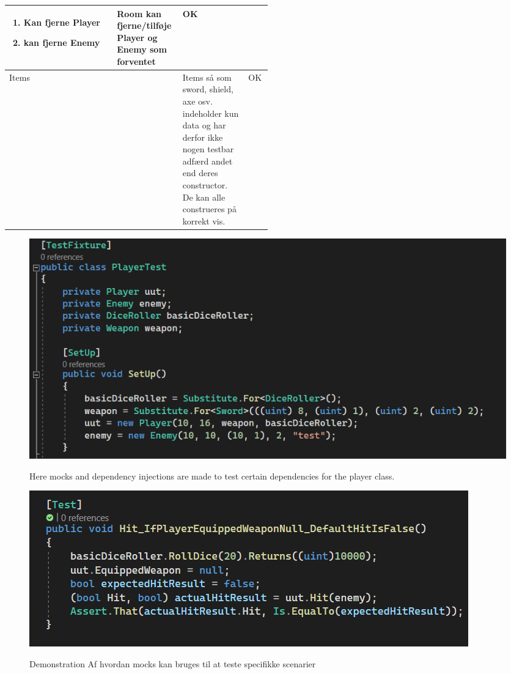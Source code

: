 \begin{center}
\begin{longtable}{|l|p{0.25\linewidth}|p{0.25\linewidth}|l|}
\begin{enumerate}
    \item Kan fjerne Player
    \item kan fjerne Enemy
  \end{enumerate}
  &
  \flushleft
  Room kan fjerne/tilføje Player og Enemy som forventet
  &
  OK
  \\ \hline
  Items
  &
  \begin{enumerate}
  \end{enumerate}
  &
  \flushleft
  Items så som sword, shield, axe osv. indeholder kun data og har derfor ikke nogen
  testbar adfærd andet end deres constructor. De kan alle construeres på korrekt vis.
  &
  OK
  \\ \hline
\end{longtable}
\addtocounter{table}{-1}
\end{center}

\newpage 

\begin{figure}[h]
  \centering
  \caption{Here mocks and dependency injections are made to test 
  certain dependencies for the player class.}
  \includegraphics[scale=0.5]{02-Body/Images/Mocks_And_Dependency_Injection.png}
  \label{fig:mock}
\end{figure}

\begin{figure}[h]
  \centering
  \caption{Demonstration Af hvordan mocks kan bruges til at teste specifikke scenarier}
  \includegraphics[scale=0.5]{02-Body/Images/UseOfMocks.png}
  \label{fig:MockUse}
\end{figure}


\newpage
